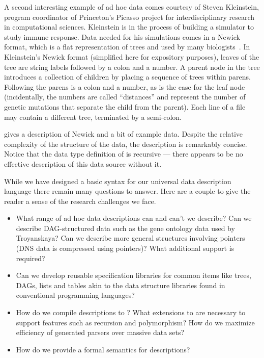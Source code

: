\documentclass[11pt]{article}
\begin{document}
A second interesting example of ad hoc data comes courtesy of
Steven Kleinstein, program coordinator of Princeton's Picasso project for
interdisciplinary research in computational sciences.  
Kleinstein is in the process of 
building a simulator to study immune response.  Data
needed for his simulations comes in a Newick format, which is
a flat representation of trees and used by many biologists~\cite{newick}.  
In Kleinstein's Newick format (simplified
here for expository purposes), leaves of the
tree are string labels followed by a colon and a number.
A parent node in the tree introduces a collection of
children by placing a sequence of trees within parens.
Following the parens is a colon and a number, as is the case
for the leaf node (incidentally, the numbers are called ``distances''
and represent the number of genetic mutations that separate the
child from the parent).  Each line of a file may contain
a different tree, terminated by a semi-colon.

 gives a description of Newick
and a bit of example data.
Despite the relative complexity of the structure of the data, 
the description is remarkably concise.
Notice that the data type definition of  is recursive ---
there appears to be no effective description of this data
source without it.  

While we have designed a basic syntax for our universal data description
language there remain many questions to answer. Here are a couple
to give the reader a sense of the research challenges we face.
\begin{itemize}
\item What range of ad hoc data descriptions can and can't we describe?
Can we describe DAG-structured data such as the gene ontology
data used by Troyanskaya?  Can we describe more general structures
involving pointers (DNS data is compressed using pointers)?  What
additional support is required?
\item Can we develop reusable
specification libraries for common items like trees, DAGs, lists and tables
akin to the data structure libraries found in
conventional programming languages?
\item How do we compile \datatype{} descriptions to \pads{}?  What
extensions to \pads{} are necessary to support \datatype{} features such as
recursion and polymorphism? How do we maximize efficiency of generated parsers
over massive data sets?
\item How do we provide a formal semantics for \datatype{} descriptions?
\end{itemize}
\end{document}
